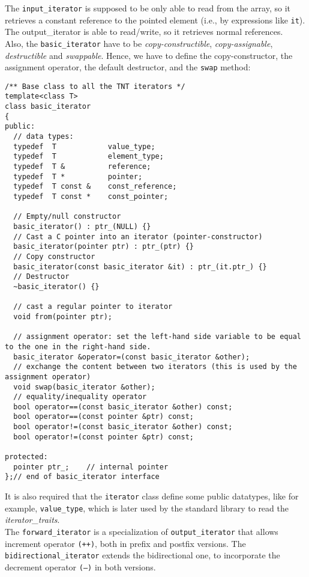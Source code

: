 The {\tt input\_iterator} is supposed to be only able to read from the array, so it retrieves a constant reference to the pointed element (i.e., by expressions like {\tt *it}). The {output\_iterator} is able to read/write, so it retrieves normal references.
\\

Also, the {\tt basic\_iterator} have to be \emph{copy-constructible}, \emph{copy-assignable}, \emph{destructible} and \emph{swappable}. Hence, we have to define the copy-constructor, the assignment operator, the default destructor, and the {\tt swap} method:
\begin{verbatim}
/** Base class to all the TNT iterators */
template<class T>
class basic_iterator
{
public:
  // data types:
  typedef  T            value_type;
  typedef  T            element_type;
  typedef  T &          reference;
  typedef  T *          pointer;
  typedef  T const &    const_reference;
  typedef  T const *    const_pointer;

  // Empty/null constructor
  basic_iterator() : ptr_(NULL) {}
  // Cast a C pointer into an iterator (pointer-constructor)
  basic_iterator(pointer ptr) : ptr_(ptr) {}
  // Copy constructor
  basic_iterator(const basic_iterator &it) : ptr_(it.ptr_) {}
  // Destructor
  ~basic_iterator() {}

  // cast a regular pointer to iterator
  void from(pointer ptr);

  // assignment operator: set the left-hand side variable to be equal to the one in the right-hand side.
  basic_iterator &operator=(const basic_iterator &other);
  // exchange the content between two iterators (this is used by the assignment operator)
  void swap(basic_iterator &other);
  // equality/inequality operator
  bool operator==(const basic_iterator &other) const;
  bool operator==(const pointer &ptr) const;
  bool operator!=(const basic_iterator &other) const;
  bool operator!=(const pointer &ptr) const;
  
protected:
  pointer ptr_;    // internal pointer
};// end of basic_iterator interface
\end{verbatim}

It is also required that the {\tt iterator} class define some public datatypes, like for example, {\tt value\_type}, which is later used by the standard library to read the {\it iterator\_traits}.
\\

The {\tt forward\_iterator} is a specialization of {\tt output\_iterator} that allows increment operator {\tt (++)}, both in prefix and postfix versions. The {\tt bidirectional\_iterator} extends the  bidirectional one, to incorporate the decrement operator {\tt (--)} in both versions.
\\

